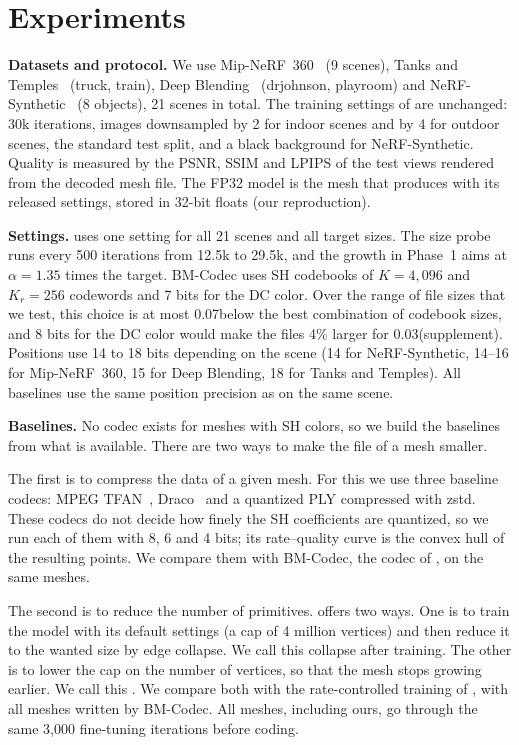 \section{Experiments}
\label{sec:exp}

\noindent\textbf{Datasets and protocol.} We use Mip-NeRF~360~\cite{barron2022mipnerf360} (9 scenes), Tanks and Temples~\cite{knapitsch2017tanks} (truck, train), Deep Blending~\cite{hedman2018deep} (drjohnson, playroom) and NeRF-Synthetic~\cite{mildenhall2020nerf} (8 objects), 21 scenes in total. The training settings of \MS are unchanged: 30k iterations, images downsampled by 2 for indoor scenes and by 4 for outdoor scenes, the standard test split, and a black background for NeRF-Synthetic. Quality is measured by the PSNR, SSIM and LPIPS of the test views rendered from the decoded mesh file. The FP32 model is the mesh that \MS produces with its released settings, stored in 32-bit floats (our reproduction).

\noindent\textbf{Settings.} \BM uses one setting for all 21 scenes and all target sizes. The size probe runs every 500 iterations from 12.5k to 29.5k, and the growth in Phase~1 aims at $\alpha = 1.35$ times the target. BM-Codec uses SH codebooks of $K = 4{,}096$ and $K_r = 256$ codewords and 7 bits for the DC color. Over the range of file sizes that we test, this choice is at most 0.07\dB below the best combination of codebook sizes, and 8 bits for the DC color would make the files 4\% larger for 0.03\dB (supplement). Positions use 14 to 18 bits depending on the scene (14 for NeRF-Synthetic, 14--16 for Mip-NeRF~360, 15 for Deep Blending, 18 for Tanks and Temples). All baselines use the same position precision as \BM on the same scene.

\noindent\textbf{Baselines.} No codec exists for meshes with SH colors, so we build the baselines from what is available. There are two ways to make the file of a mesh smaller.

The first is to compress the data of a given mesh. For this we use three baseline codecs: MPEG TFAN~\cite{mamou2009tfan}, Draco~\cite{draco} and a quantized PLY compressed with zstd. These codecs do not decide how finely the SH coefficients are quantized, so we run each of them with 8, 6 and 4 bits; its rate--quality curve is the convex hull of the resulting points. We compare them with BM-Codec, the codec of \BM, on the same meshes.

The second is to reduce the number of primitives. \MS offers two ways. One is to train the model with its default settings (a cap of 4 million vertices) and then reduce it to the wanted size by edge collapse. We call this collapse after training. The other is to lower the cap on the number of vertices, so that the mesh stops growing earlier. We call this \MSc. We compare both with the rate-controlled training of \BM, with all meshes written by BM-Codec. All meshes, including ours, go through the same 3{,}000 fine-tuning iterations before coding.

